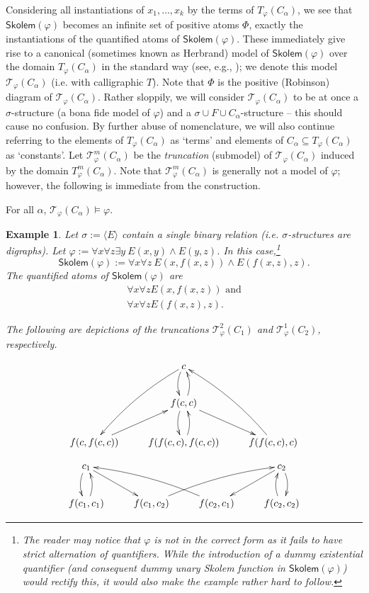 \documentclass{LMCS}
\newtheorem{ex}{Example}
\newcommand{\skolem}[0]{\ensuremath{\mathsf{Skolem}}}
\begin{document}
Considering all instantiations of $x_1,\ldots,x_k$ by the terms of $T_\varphi(C_\alpha)$, we see that $\skolem(\varphi)$ becomes an infinite set of positive atoms $\Phi$, exactly the instantiations of the quantified atoms of $\skolem(\varphi)$. These immediately give rise to a canonical (sometimes known as Herbrand) model of $\skolem(\varphi)$ over the domain  $T_\varphi(C_\alpha)$ in the standard way (see, e.g., \cite{Hodges}); we denote this model $\mathcal{T}_\varphi(C_\alpha)$ (\mbox{i.e.} with calligraphic $T$). Note that $\Phi$ is the positive (Robinson) diagram of $\mathcal{T}_\varphi(C_\alpha)$. Rather sloppily, we will consider $\mathcal{T}_\varphi(C_\alpha)$ to be at once a $\sigma$-structure (a bona fide model of $\varphi$) and a $\sigma \cup F \cup C_\alpha$-structure -- this should cause no confusion. By further abuse of nomenclature, we will also continue referring to the elements of $T_\varphi(C_\alpha)$ as `terms' and elements of $C_\alpha \subseteq T_\varphi(C_\alpha)$ as `constants'. Let $\mathcal{T}^m_\varphi(C_\alpha)$ be the \emph{truncation} (submodel) of $\mathcal{T}_\varphi(C_\alpha)$ induced by the domain $T^m_\varphi(C_\alpha)$. Note that $\mathcal{T}^m_\varphi(C_\alpha)$ is generally not a model of $\varphi$; however, the following is immediate from the construction.
\begin{fact}
For all $\alpha$, $\mathcal{T}_\varphi(C_\alpha) \models \varphi$.
\end{fact}
\begin{ex}
\label{ex:main}
Let $\sigma:=\langle E \rangle$ contain a single binary relation (i.e. $\sigma$-structures are digraphs).
Let $\varphi:=\forall x \forall z \exists y \ E(x,y) \wedge E(y,z)$. In this case,\footnote{The reader may notice that $\varphi$ is not in the correct form as it fails to have strict alternation of quantifiers. While the introduction of a dummy existential quantifier (and consequent dummy unary Skolem function in $\skolem(\varphi)$) would rectify this, it would also make the example rather hard to follow.} 
\[ \skolem(\varphi):= \forall x \forall z \ E(x,f(x,z)) \wedge E(f(x,z),z).\]
The quantified atoms of $\skolem(\varphi)$ are 
\[
\begin{array}{c}
\forall x \forall z E(x,f(x,z)) \mbox{ and} \\
\forall x \forall z E(f(x,z),z). 
\end{array}
\]

\noindent The following are depictions of the truncations $\mathcal{T}^2_\varphi(C_1)$ and $\mathcal{T}^1_\varphi(C_2)$, respectively.

\[
\xymatrix{
& c \ar@/_/[ddl] \ar@/_/[d] & \\
& f(c,c) \ar@/_/[u] \ar@/_/[d] \ar[dr] & \\
f(c,f(c,c)) \ar[ur] & f(f(c,c),f(c,c)) \ar@/_/[u] & f(f(c,c),c) \ar@/_/[uul] \\
}
\]

\[
\xymatrix{
c_1 \ar@/_/[d] \ar[dr] & & & c_2 \ar@/^/[d] \ar[dl] \\
f(c_1,c_1) \ar@/_/[u] & f(c_1,c_2) \ar@/^/[urr] & f(c_2,c_1) \ar@/_/[ull] & f(c_2,c_2) \ar@/^/[u] \\
}
\]

%
 \end{ex}
\end{document}

